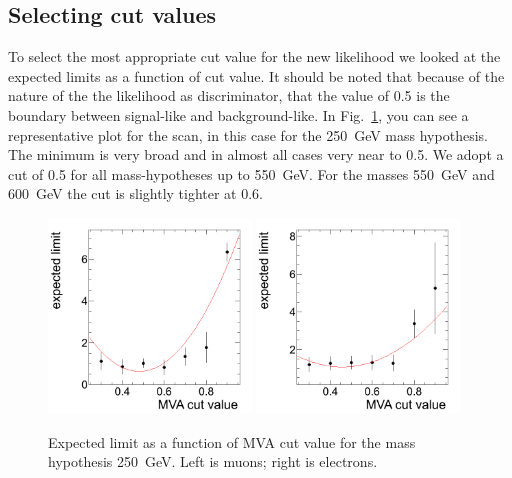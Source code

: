 \subsection{Selecting cut values}
\label{sec:mvacuts}

To select the most appropriate cut value for the new likelihood we
looked at the expected limits as a function of cut value.  It should
be noted that because of the nature of the the likelihood as
discriminator, that the value of 0.5 is the boundary between
signal-like and background-like.  In Fig.~\ref{fig:cutscan}, you can
see a representative plot for the scan, in this case for the 250~GeV
mass hypothesis.  The minimum is very broad and in almost all cases
very near to 0.5.  We adopt a cut of 0.5 for all mass-hypotheses up to
550~GeV.  For the masses 550~GeV and 600~GeV the cut is slightly
tighter at 0.6.

\begin{figure}[btph]
  \includegraphics[width=0.48\textwidth]{plots/HWW250_mu_plot.png}
  \includegraphics[width=0.48\textwidth]{plots/HWW250_el_plot.png}
  \caption{\label{fig:cutscan}Expected limit as a function of MVA cut
    value for the mass hypothesis 250~GeV.  Left is muons; right is
    electrons.}
\end{figure}

